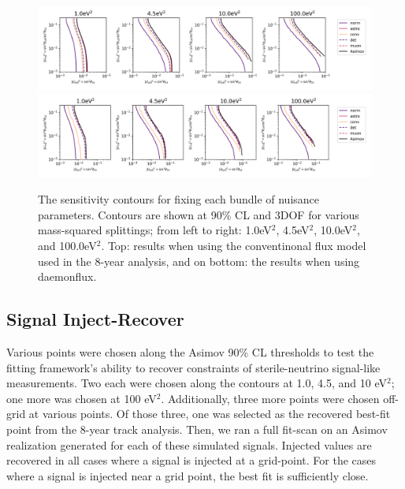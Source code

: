 \documentclass[main.tex]{subfiles}
\begin{document}
\begin{figure}
    \centering
    \includegraphics[width=0.95\linewidth]{figures/systematic_impact_joint.png}\\
    \includegraphics[width=0.95\linewidth]{figures/Systematic_impact_joint_daemon.png}
    \caption{The sensitivity contours for fixing each bundle of nuisance parameters. Contours are shown at 90\% CL and 3DOF for various mass-squared splittings; from left to right: 1.0eV$^{2}$, 4.5eV$^{2}$, 10.0eV$^{2}$, and 100.0eV$^{2}$. Top: results when using the conventinonal flux model used in the 8-year analysis, and on bottom: the results when using daemonflux.}\label{fig:impact}
\end{figure}

\subsection{Signal Inject-Recover}

Various points were chosen along the Asimov 90\% CL thresholds to test the fitting framework's ability to recover constraints of sterile-neutrino signal-like measurements. 
Two each were chosen along the contours at 1.0, 4.5, and 10 eV$^{2}$; one more was chosen at 100 eV$^{2}$. 
Additionally, three more points were chosen off-grid at various points.
Of those three, one was selected as the recovered best-fit point from the 8-year track analysis. 
Then, we ran a full fit-scan on an Asimov realization generated for each of these simulated signals. 
Injected values are recovered in all cases where a signal is injected at a grid-point. 
For the cases where a signal is injected near a grid point, the best fit is sufficiently close.
\end{document}

